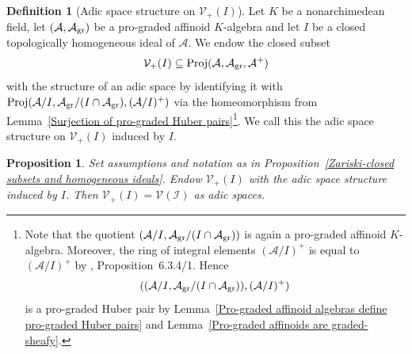 \documentclass[12pt,twoside,a4paper]{article}
\newtheorem{prop}[thm]{Proposition}
\theoremstyle{definition}
\newtheorem{mydef}[thm]{Definition}
\theoremstyle{remark}
\newcommand\gr{{\rm gr}}
\newcommand\Proj{{\rm Proj}}
\begin{document}
\begin{mydef}[Adic space structure on $\mathcal{V}_{+}(I)$]\label{Adic space structure on Zariski-closed subsets}Let $K$ be a nonarchimedean field, let $(\mathcal{A}, \mathcal{A}_{\gr})$ be a pro-graded affinoid $K$-algebra and let $I$ be a closed topologically homogeneous ideal of $\mathcal{A}$. We endow the closed subset \begin{equation*}\mathcal{V}_{+}(I)\subseteq \Proj(\mathcal{A}, \mathcal{A}_{\gr}, \mathcal{A}^{+})\end{equation*}with the structure of an adic space by identifying it with $\Proj(\mathcal{A}/I, \mathcal{A}_{\gr}/(I\cap \mathcal{A}_{\gr}), (\mathcal{A}/I)^{+})$ via the homeomorphism from Lemma~\ref{Surjection of pro-graded Huber pairs}\footnote{Note that the quotient $(\mathcal{A}/I, \mathcal{A}_{\gr}/(I\cap \mathcal{A}_{\gr}))$ is again a pro-graded affinoid $K$-algebra. Moreover, the ring of integral elements $(\mathcal{A}/I)^{+}$ is equal to $(\mathcal{A}/I)^{+}$ by \cite{BGR}, Proposition~6.3.4/1. Hence \begin{equation*}((\mathcal{A}/I, \mathcal{A}_{\gr}/(I\cap \mathcal{A}_{\gr})), (\mathcal{A}/I)^{+})\end{equation*}is a pro-graded Huber pair by Lemma~\ref{Pro-graded affinoid algebras define pro-graded Huber pairs} and Lemma~\ref{Pro-graded affinoids are graded-sheafy}.}. We call this the adic space structure on $\mathcal{V}_{+}(I)$ induced by $I$. \end{mydef}
\begin{prop}\label{Zariski-closed subsets and homogeneous ideals 2}Set assumptions and notation as in Proposition~\ref{Zariski-closed subsets and homogeneous ideals}. Endow $\mathcal{V}_{+}(I)$ with the adic space structure induced by $I$. Then $\mathcal{V}_{+}(I)=\mathcal{V}(\mathcal{I})$ as adic spaces.\end{prop}
\end{document}
